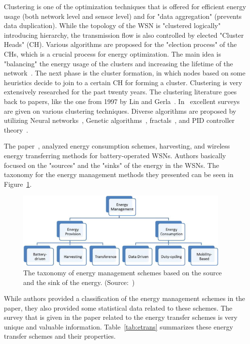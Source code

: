 \documentclass[12pt, oneandhalf, chaparabic, sees, ms]{metu}
\begin{document}
Clustering is one of the optimization techniques that is offered for efficient energy usage (both network level and sensor level) and for "data
aggregation" (prevents data duplication). While the topology of the WSN is "clustered logically" introducing hierarchy, the transmission flow is also
controlled by elected "Cluster Heads" (CH). Various algorithms are proposed for the "election process" of the CHs, which is a crucial process for
energy optimization. The main idea is "balancing" the energy usage of the clusters and increasing the lifetime of the network~\cite{boyinbode2010}. The next phase is
the cluster formation, in which nodes based on some heuristics decide to join to a certain CH for forming a cluster.
Clustering is very extensively researched for the past twenty years. The clustering literature goes back to papers, like the one from 1997 by Lin and
Gerla~\cite{lin1997}. In~\cite{rostami2018,xu2017} excellent surveys are given on various clustering techniques. 
Diverse algorithms are proposed by utilizing Neural networks~\cite{subha2013},
Genetic algorithms~\cite{nayak2017}, fractals~\cite{almedia2016}, and PID controller theory~\cite{hu2006}.

The paper~\cite{khan2015}, analyzed energy consumption schemes, harvesting, and wireless energy transferring methods for battery-operated WSNs.
Authors basically focused on the "sources" and the "sinks" of the energy in the WSNs.
The taxonomy for the energy management methods they presented can be seen in Figure~\ref{fig:energy-tax2}.
%
%
%
\begin{figure}[!htbp]
 \begin{center}
  \includegraphics[width=0.95\textwidth]{energy-tax2.png}
 \end{center}
 \caption{The taxonomy of energy management schemes based on the source and the sink of the energy. (Source:~\protect\cite{khan2015})}
  \label{fig:energy-tax2}
\end{figure}
% 
%
%
While authors provided a classification of the energy management schemes in the paper, 
they also provided some statistical data related to these schemes. 
The survey that is given in the paper related to the energy transfer schemes is very unique and valuable information. 
Table~\ref{tab:etrans} summarizes these energy transfer schemes and their properties.
\end{document}
